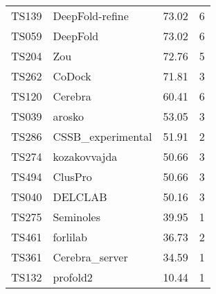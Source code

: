 \begin{table}[ht]
{\begin{tabular}{llrr}
TS139 & DeepFold-refine & 73.02 & 6 \\ 
TS059 & DeepFold & 73.02 & 6 \\ 
TS204 & Zou & 72.76 & 5 \\ 
TS262 & CoDock & 71.81 & 3 \\ 
TS120 & Cerebra & 60.41 & 6 \\ 
TS039 & arosko & 53.05 & 3 \\ 
TS286 & CSSB\_experimental & 51.91 & 2 \\ 
TS274 & kozakovvajda & 50.66 & 3 \\ 
TS494 & ClusPro & 50.66 & 3 \\ 
TS040 & DELCLAB & 50.16 & 3 \\ 
TS275 & Seminoles & 39.95 & 1 \\ 
TS461 & forlilab & 36.73 & 2 \\ 
TS361 & Cerebra\_server & 34.59 & 1 \\ 
TS132 & profold2 & 10.44 & 1 \\ 
\bottomrule
\end{tabular}%
}
\end{table}
